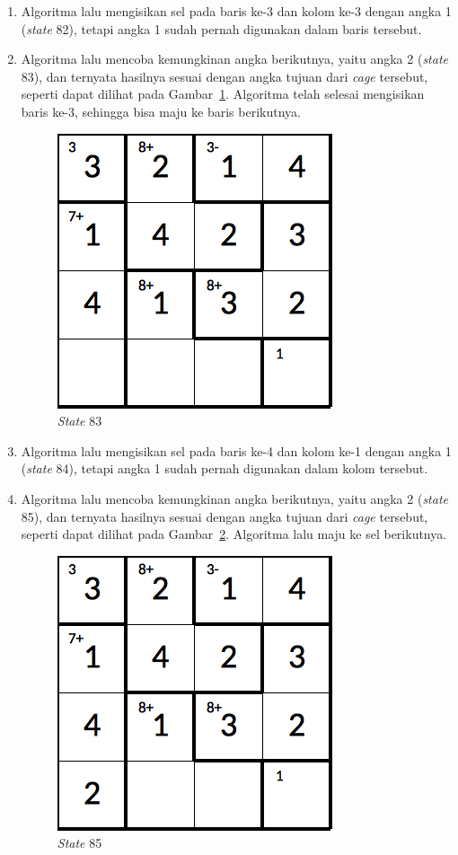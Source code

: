 \begin{enumerate}
\item Algoritma lalu mengisikan sel pada baris ke-3 dan kolom ke-3 dengan angka 1 (\textit{state} 82), tetapi angka 1 sudah pernah digunakan dalam baris tersebut.
\item Algoritma lalu mencoba kemungkinan angka berikutnya, yaitu angka 2 (\textit{state} 83), dan ternyata hasilnya sesuai dengan angka tujuan dari \textit{cage} tersebut, seperti dapat dilihat pada Gambar~\ref{fig:analisisbt28}. Algoritma telah selesai mengisikan baris ke-3, sehingga bisa maju ke baris berikutnya.

\begin{figure}
\centering
\captionsetup{justification=centering}
\includegraphics[scale=0.333]{Gambar/backtracking/State83}
\caption[\textit{State} 83]{\textit{State} 83}
\label{fig:analisisbt28}
\end{figure}

\item Algoritma lalu mengisikan sel pada baris ke-4 dan kolom ke-1 dengan angka 1 (\textit{state} 84), tetapi angka 1 sudah pernah digunakan dalam kolom tersebut.
\item Algoritma lalu mencoba kemungkinan angka berikutnya, yaitu angka 2 (\textit{state} 85), dan ternyata hasilnya sesuai dengan angka tujuan dari \textit{cage} tersebut, seperti dapat dilihat pada Gambar~\ref{fig:analisisbt29}. Algoritma lalu maju ke sel berikutnya.

\begin{figure}
\centering
\captionsetup{justification=centering}
\includegraphics[scale=0.333]{Gambar/backtracking/State85}
\caption[\textit{State} 85]{\textit{State} 85}
\label{fig:analisisbt29}
\end{figure}


\end{enumerate}
